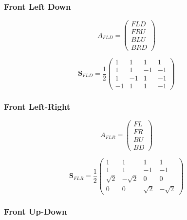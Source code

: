 \documentclass[12pt]{article}
\begin{document}
\subsubsection{Front Left Down}

\begin{equation}	\label{eq:afld_sig}
A_{FLD} = \begin{pmatrix}
	FLD\\
	FRU\\
	BLU\\
	BRD
\end{pmatrix}
\end{equation}


\begin{equation}	\label{eq:ab_fld}
\mathbf{S}_{FLD} = \frac{1}{2} \begin{pmatrix}
	1 & 1 & 1 & 1\\
	1 & 1 & -1 & -1\\
	1 & -1 & 1 & -1\\
	-1 & 1 & 1 & -1
\end{pmatrix}
\end{equation}

\subsubsection{Front Left-Right}

\begin{equation}	\label{eq:aflr_sig}
A_{FLR} = \begin{pmatrix}
	FL\\
	FR\\
	BU\\
	BD
\end{pmatrix}
\end{equation}


\begin{equation}	\label{eq:ab_flr}
\mathbf{S}_{FLR} = \frac{1}{2} \begin{pmatrix}
	1 & 1 & 1 & 1\\
	1 & 1 & -1 & -1\\
	\sqrt{2} & -\sqrt{2} & 0 & 0\\
	0 & 0 & \sqrt{2} & -\sqrt{2}
\end{pmatrix}
\end{equation}

\subsubsection{Front Up-Down}
\end{document}
